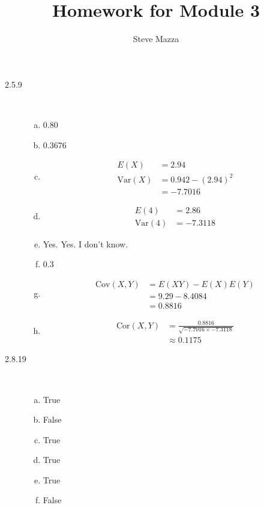 \documentclass[letterpaper,10pt]{article}
\title{Homework for Module 3}
\author{Steve Mazza}
\begin{document}
\maketitle

\begin{description}
\item[2.5.9] \ 
\begin{enumerate}[a)]
\item 0.80
\item 0.3676
\item \begin{align*}E(X) &= 2.94\\ \mbox{Var}(X) &= 0.942 - (2.94)^{2}\\ &= -7.7016\end{align*}
\item \begin{align*}E(4) &= 2.86\\ \mbox{Var}(4) &= -7.3118\end{align*}
\item Yes. Yes. I don't know.
\item 0.3
\item \begin{align*}
\mbox{Cov}(X, Y) &= E(XY) - E(X)E(Y) \\
&= 9.29 - 8.4084 \\
&= 0.8816
\end{align*}
\item \begin{align*}
\mbox{Cor}(X, Y) &= \frac{0.8816}{\sqrt{-7.7016\times -7.3118}} \\
&\approx 0.1175
\end{align*}
\end{enumerate}

\item[2.8.19] \ 
\begin{enumerate}[a)]
\item True
\item False
\item True
\item True
\item True
\item False
\end{enumerate}


\end{description}
\end{document}
